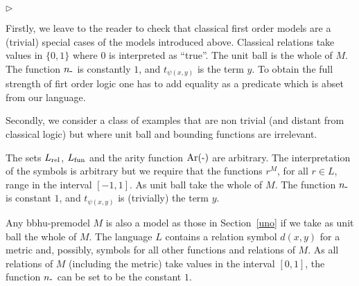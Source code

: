 \documentclass[12pt,letterpaper,oneside,reqno]{amsart}
\newcommand{\mylabel}[1]{{#1}\hfill}
\renewenvironment{itemize}
  {\begin{list}{$\triangleright$}{%
   \setlength{\parskip}{0mm}
   \setlength{\topsep}{.2\baselineskip}
   \setlength{\rightmargin}{0mm}
   \setlength{\listparindent}{0mm}
   \setlength{\itemindent}{0mm}
   \setlength{\labelwidth}{3ex}
   \setlength{\itemsep}{.2\baselineskip}
   \setlength{\parsep}{.2\baselineskip}
   \setlength{\partopsep}{0mm}
   \setlength{\labelsep}{1ex}
   \setlength{\leftmargin}{\labelwidth+\labelsep}
   \let\makelabel\mylabel}}{%
   \end{list}}
\theoremstyle{plain}
\theoremstyle{remark}
\begin{document}
\begin{itemize}
  \item [1.] Firstly, we leave to the reader to check that classical first order models are a (trivial) special cases of the models introduced above.
  Classical relations take values in $\{0,1\}$ where $0$ is interpreted as ``true''.
  The unit ball is the whole of $M$. 
  The function $n_{\mbox-}$ is constantly $1$, and $t_{\psi(x,y)}$ is the term $y$.
  To obtain the full strength of firt order logic one has to add equality as a predicate which is abset from our language.

  \item [2.] Secondly, we consider a class of examples that are non trivial (and distant from classical logic) but where unit ball and bounding functions are irrelevant.
  
  The sets $L_{\rm rel}$, $L_{\rm fun}$ and the arity function ${\rm Ar}(\mbox-)$ are arbitrary.
  The interpretation of the symbols is arbitrary but we require that the functions $r^M$, for all $r\in L$, range in the interval $[-1,1]$.
  As unit ball take the whole of $M$.
  The function $n_{\mbox-}$ is constant $1$, and $t_{\psi(x,y)}$ is (trivially) the term $y$.

  \item [3.] Any {\sc bbhu}-premodel $M$ is also a model as those in Section~\ref{uno} if we take as unit ball the whole of $M$.
  The language $L$ contains a relation symbol $d(x,y)$ for a metric and, possibly, symbols for all other functions and relations of $M$.
  As all relations of $M$ (including the metric) take values in the interval $[0,1]$, the function $n_{\mbox-}$ can be set to be the constant $1$.
  

  

\end{itemize}
\end{document}
